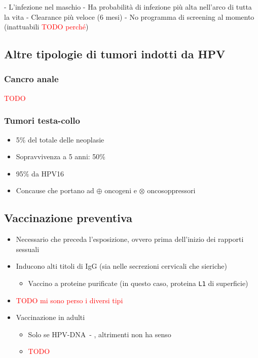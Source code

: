 \documentclass[italian,]{article}
\providecommand{\tightlist}{%
  \setlength{\itemsep}{0pt}\setlength{\parskip}{0pt}}
\newcommand{\yellowbox}[2]{\begin{tcolorbox}[title=#1,colback=yellow!5,colframe=yellow!75!red, coltitle=black]#2\end{tcolorbox}} %
\newcommand{\att}[0]{ $\oplus$ }                                        %
\newcommand{\ini}[0]{ $\otimes$ }                                       %
\newcommand{\TODO}[1]{\textcolor{red}{\textsf{\footnotesize{TODO #1}}}} %
\begin{document}
\yellowbox{HPV nel maschio}{
- L'infezione nel maschio
    - Ha probabilità di infezione più alta nell'arco di tutta la vita
    - Clearance più veloce (6 mesi)
- No programma di screening al momento (inattuabili \TODO{perché})
}

\hypertarget{altre-tipologie-di-tumori-indotti-da-hpv}{%
\subsection{Altre tipologie di tumori indotti da
HPV}\label{altre-tipologie-di-tumori-indotti-da-hpv}}

\hypertarget{cancro-anale}{%
\subsubsection{Cancro anale}\label{cancro-anale}}

\TODO{}

\hypertarget{tumori-testa-collo}{%
\subsubsection{Tumori testa-collo}\label{tumori-testa-collo}}

\begin{itemize}
\tightlist
\item
  5\% del totale delle neoplasie
\item
  Sopravvivenza a 5 anni: 50\%
\item
  95\% da HPV16
\item
  Concause che portano ad \att oncogeni e \ini oncosoppressori
\end{itemize}

\hypertarget{vaccinazione-preventiva}{%
\subsection{Vaccinazione preventiva}\label{vaccinazione-preventiva}}

\begin{itemize}
\item
  Necessario che preceda l'esposizione, ovvero prima dell'inizio dei
  rapporti sessuali
\item
  Inducono alti titoli di IgG (sia nelle secrezioni cervicali che
  sieriche)

  \begin{itemize}
  \tightlist
  \item
    Vaccino a proteine purificate (in questo caso, proteina \texttt{L1}
    di superficie)
  \end{itemize}
\item
  \TODO{mi sono perso i diversi tipi}
\item
  Vaccinazione in adulti

  \begin{itemize}
  \item
    Solo se HPV-DNA~- , altrimenti non ha senso
  \item
    \TODO{}
  \end{itemize}
\end{itemize}
\end{document}
